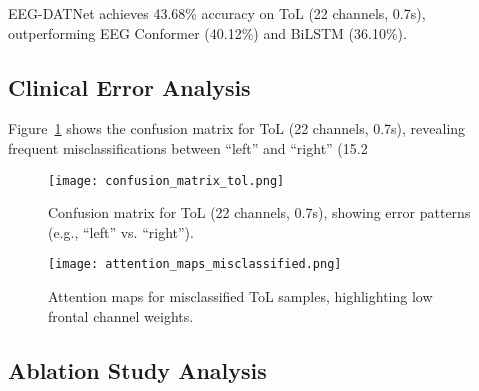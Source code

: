 \documentclass[pdflatex,sn-mathphys-num]{sn-jnl}%
\theoremstyle{thmstyleone}
\theoremstyle{thmstyletwo}
\theoremstyle{thmstylethree}
\begin{document}
EEG-DATNet achieves 43.68\% accuracy on ToL (22 channels, 0.7s), outperforming EEG Conformer (40.12\%) and BiLSTM (36.10\%).

\subsection{Clinical Error Analysis}\label{subsec:clinical_error}
Figure~\ref{fig:confusion_matrix} shows the confusion matrix for ToL (22 channels, 0.7s), revealing frequent misclassifications between “left” and “right” (15.2%

\begin{figure}[H]
    \centering
    \texttt{[image: confusion\_matrix\_tol.png]}
    \caption{Confusion matrix for ToL (22 channels, 0.7s), showing error patterns (e.g., “left” vs. “right”).}
    \label{fig:confusion_matrix}
\end{figure}

\begin{figure}[H]
    \centering
    \texttt{[image: attention\_maps\_misclassified.png]}
    \caption{Attention maps for misclassified ToL samples, highlighting low frontal channel weights.}
    \label{fig:attention_maps}
\end{figure}

\subsection{Ablation Study Analysis}
\end{document}
